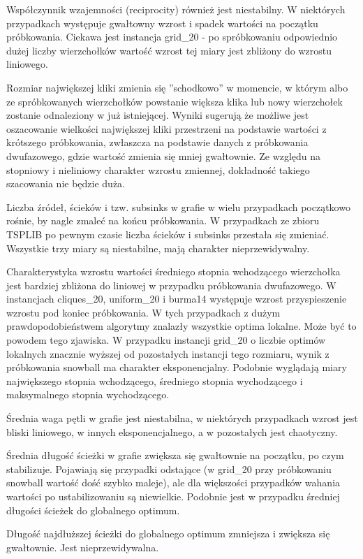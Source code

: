 Współczynnik wzajemności (reciprocity) również jest niestabilny.
W niektórych przypadkach występuje gwałtowny wzrost i spadek wartości na początku próbkowania.
Ciekawa jest instancja grid\_20 - po spróbkowaniu odpowiednio dużej liczby wierzchołków
wartość wzrost tej miary jest zbliżony do wzrostu liniowego.

Rozmiar największej kliki zmienia się ''schodkowo'' w momencie, w którym albo ze spróbkowanych wierzchołków
powstanie większa klika lub nowy wierzchołek zostanie odnaleziony w już istniejącej.
Wyniki sugerują że możliwe jest oszacowanie wielkości największej kliki przestrzeni na podstawie wartości
z krótszego próbkowania, zwłaszcza na podstawie danych z próbkowania dwufazowego, gdzie
wartość zmienia się mniej gwałtownie. Ze względu na stopniowy i nieliniowy charakter wzrostu zmiennej,
dokładność takiego szacowania nie będzie duża.

Liczba źródeł, ścieków i tzw. subsinks w grafie w wielu przypadkach początkowo rośnie, by nagle zmaleć na końcu próbkowania.
W przypadkach ze zbioru TSPLIB po pewnym czasie liczba ścieków i subsinks przestała się zmieniać.
Wszystkie trzy miary są niestabilne, mają charakter nieprzewidywalny.

Charakterystyka wzrostu wartości średniego stopnia wchodzącego wierzchołka jest bardziej zbliżona do liniowej
w przypadku próbkowania dwufazowego. W instancjach cliques\_20, uniform\_20 i burma14 występuje
wzrost przyspieszenie wzrostu pod koniec próbkowania.
W tych przypadkach z dużym prawdopodobieństwem algorytmy znalazły wszystkie optima lokalne.
Może być to powodem tego zjawiska.
W przypadku instancji grid\_20 o liczbie optimów lokalnych znacznie wyższej od pozostałych instancji tego rozmiaru,
wynik z próbkowania snowball ma charakter eksponencjalny.
Podobnie wyglądają miary największego stopnia wchodzącego, średniego stopnia wychodzącego i maksymalnego stopnia wychodzącego.

Średnia waga pętli w grafie jest niestabilna, w niektórych przypadkach wzrost jest bliski liniowego, w innych
eksponencjalnego, a w pozostałych jest chaotyczny.

Średnia długość ścieżki w grafie zwiększa się gwałtownie na początku, po czym stabilizuje.
Pojawiają się przypadki odstające (w grid\_20 przy próbkowaniu snowball wartość dość szybko maleje),
ale dla większości przypadków wahania wartości po ustabilizowaniu są niewielkie.
Podobnie jest w przypadku średniej długości ścieżek do globalnego optimum.

Długość najdłuższej ścieżki do globalnego optimum zmniejsza i zwiększa się gwałtownie.
Jest nieprzewidywalna.

